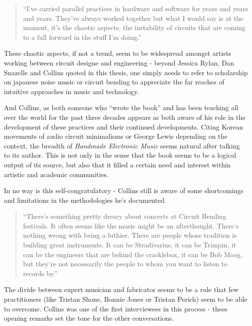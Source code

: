 \begin{quote}
	``I’ve carried parallel practices in hardware and software for years and years and years. They’ve always worked together but what I would say is at the moment, it’s the chaotic aspects, the instability of circuits that are coming to a full forward in the stuff I’m doing.''
	
	\end{quote}
	
These chaotic aspects, if not a trend, seem to be widespread amongst artists working between circuit designe and engineering - beyond Jessica Rylan, Dan Snazelle and Collins quoted in this thesis, one simply needs to refer to scholarship on japanese noise music or circuit bending to appreciate the far reaches of intuitive approaches in music and technology. 

And Collins, as both someone who ``wrote the book'' and has been teaching all over the world for the past three decades appears as both aware of his role in the development of these practices and their continued developments. Citing Korean movements of audio circuit minimalisms or George Lewis depending on the context, the breadth of \emph{Handmade Electronic Music} seems natural after talking to its author. This is not only in the sense that the book seems to be a logical output of its source, but also that it filled a certain need and interest within artistic and academic communities. 

In no way is this self-congratulatory - Collins still is aware of some shortcomings and limitations in the methodologies he's documented. 

\begin{quote}
	
	``There’s something pretty dreary about concerts at Circuit Bending festivals. It often seems like the music might be an afterthought. There’s nothing wrong with being a luthier. There are people whose tradition is building great instruments. It can be Stradivarius, it can be Trimpin, it can be the engineers that are behind the cracklebox, it can be Bob Moog, but they’re not necessarily the people to whom you want to listen to records by.''
	
	\end{quote}
	
The divide between expert musician and fabricator seems to be a rule that few practitioners (like Tristan Shone, Bonnie Jones or Tristan Perich) seem to be able to overcome. Collins was one of the first interviewees in this process - these opening remarks set the tone for the other conversations. 

